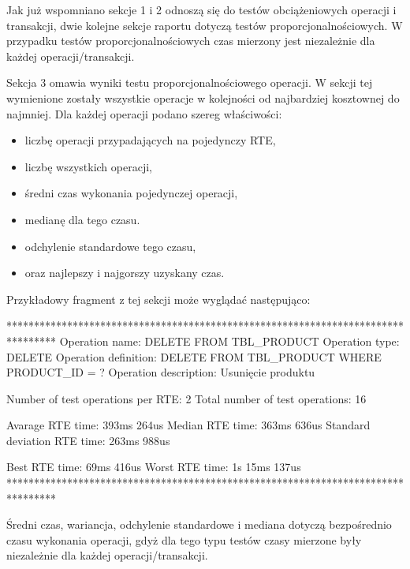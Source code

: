 Jak już wspomniano sekcje 1 i 2 odnoszą się do testów obciążeniowych operacji i transakcji,
dwie kolejne sekcje raportu dotyczą testów proporcjonalnościowych. W przypadku testów proporcjonalnościowych
czas mierzony jest niezależnie dla każdej operacji/transakcji.

Sekcja 3 omawia wyniki testu proporcjonalnościowego operacji. W sekcji tej wymienione zostały
wszystkie operacje w kolejności od najbardziej kosztownej do najmniej. Dla każdej operacji 
podano szereg właściwości:
\begin{itemize}
\item liczbę operacji przypadających na pojedynczy RTE,
\item liczbę wszystkich operacji,
\item średni czas wykonania pojedynczej operacji,
\item medianę dla tego czasu.
\item odchylenie standardowe tego czasu,
\item oraz najlepszy i najgorszy uzyskany czas.
\end{itemize}
Przykładowy fragment z tej sekcji może wyglądać następująco:
\begin{codeblock}
*********************************************************************************
Operation name: DELETE FROM TBL_PRODUCT
Operation type: DELETE
Operation definition:  DELETE FROM TBL_PRODUCT WHERE PRODUCT_ID = ?
Operation description: Usunięcie produktu

Number of test operations per RTE:   2
Total number of test operations:    16

Avarage RTE time:                393ms 264us
Median RTE time:                 363ms 636us
Standard deviation RTE time:     263ms 988us

Best RTE time:                    69ms 416us
Worst RTE time:               1s  15ms 137us
*********************************************************************************
\end{codeblock} 
Średni czas, wariancja, odchylenie standardowe i mediana dotyczą
bezpośrednio czasu wykonania operacji, gdyż dla tego typu testów czasy mierzone
były niezależnie dla każdej operacji/transakcji.

